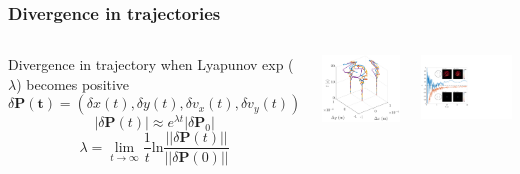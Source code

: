 \documentclass{beamer}
\begin{document}
\begin{frame}
\frametitle{Divergence in trajectories}
\begin{columns}

Divergence in trajectory when Lyapunov exp ($\lambda$) becomes positive
$$
\delta \mathbf{P(t)} = (\delta x(t), \delta y(t), \delta v_x(t), \delta v_y(t))
$$
$$
|\delta\mathbf{P}(t)| \approx e^{\lambda t} |\delta \mathbf{P}_0|
$$
$$
\lambda = \lim_{t\to\infty}\frac{1}{t}\text{ln}\frac{||\delta\textbf{P}(t)||}{||\delta\textbf{P}(0)||}
$$

\includegraphics[width=\textwidth]{../data/2d/evolution/evolution}

\includegraphics[width=\textwidth]{../data/2d/lyap/lyap}
\end{columns}
\end{frame}
\end{document}

